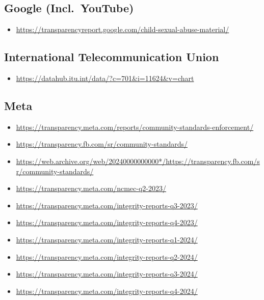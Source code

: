 {%
\subsection*{Google (Incl.\ YouTube)}
{\footnotesize
\begin{itemize}
\item[]\url{https://transparencyreport.google.com/child-sexual-abuse-material/}
\end{itemize}
}


\subsection*{International Telecommunication Union}
{\footnotesize
\begin{itemize}
\item[]\url{https://datahub.itu.int/data/?c=701&i=11624&v=chart}
\end{itemize}
}


\subsection*{Meta}
{\footnotesize
\begin{itemize}
\item[]\url{https://transparency.meta.com/reports/community-standards-enforcement/}
\item[]\url{https://transparency.fb.com/sr/community-standards/}
\item[]\url{https://web.archive.org/web/20240000000000*/https://transparency.fb.com/sr/community-standards/}
\item[]\url{https://transparency.meta.com/ncmec-q2-2023/}
\item[]\url{https://transparency.meta.com/integrity-reports-q3-2023/}
\item[]\url{https://transparency.meta.com/integrity-reports-q4-2023/}
\item[]\url{https://transparency.meta.com/integrity-reports-q1-2024/}
\item[]\url{https://transparency.meta.com/integrity-reports-q2-2024/}
\item[]\url{https://transparency.meta.com/integrity-reports-q3-2024/}
\item[]\url{https://transparency.meta.com/integrity-reports-q4-2024/}
\end{itemize}
}


}
